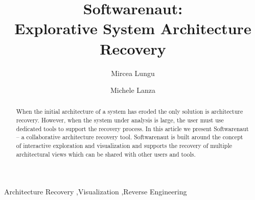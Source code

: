 \documentclass[preprint,12pt]{elsarticle}
\begin{document}
\begin{frontmatter}



\title{Softwarenaut:\\ Explorative System Architecture Recovery}



\author{Mircea Lungu}
\address{Software Composition Group - University of Bern, Switzerland}

\author{Michele Lanza}
\address{REVEAL @ Faculty of Informatics - University of Lugano, Switzerland}


\begin{abstract}
When the initial architecture of a system has eroded the only solution is architecture recovery. However, when the system under analysis is large, the user must use dedicated tools to support the recovery process. In this article we present Softwarenaut -- a collaborative architecture recovery tool. Softwarenaut is built around the concept of interactive exploration and visualization and supports the recovery of multiple architectural views which can be shared with other users and tools. 
\end{abstract}

\begin{keyword}
Architecture Recovery \sep Visualization \sep Reverse Engineering
\end{keyword}

\end{frontmatter}

\end{document}
